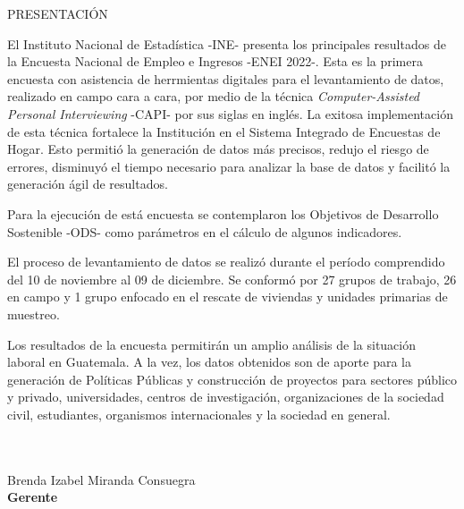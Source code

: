 \begin{center}
{\Bold \LARGE PRESENTACIÓN}\\[2cm]
\end{center}

El Instituto Nacional de Estadística -INE- presenta los principales resultados de la Encuesta Nacional de Empleo e Ingresos -ENEI 2022-. Esta es la primera encuesta con asistencia de herrmientas digitales para el levantamiento de datos, realizado en campo cara a cara, por medio de la técnica \textit{Computer-Assisted Personal Interviewing} -CAPI- por sus siglas en inglés. La exitosa implementación de esta técnica fortalece la Institución en el Sistema Integrado de Encuestas de Hogar. Esto permitió la generación de datos más precisos, redujo el riesgo de errores, disminuyó el tiempo necesario para analizar la base de datos y facilitó la generación ágil de resultados.

Para la ejecución de está encuesta se contemplaron los Objetivos de Desarrollo Sostenible -ODS- como parámetros en el cálculo de algunos indicadores. 

El proceso de levantamiento de datos se realizó durante el período comprendido del 10 de noviembre al 09 de diciembre. Se conformó por 27 grupos de trabajo,  26 en campo y 1 grupo enfocado en el rescate de viviendas y unidades primarias de muestreo.

Los resultados de la encuesta permitirán un amplio análisis de la situación laboral en Guatemala. A la vez, los datos obtenidos son de aporte para la generación de Políticas Públicas y construcción de proyectos para sectores público y privado, universidades, centros de investigación, organizaciones de la sociedad civil, estudiantes, organismos internacionales y la sociedad en general.\\
\\
\\
\begin{center}
Brenda Izabel Miranda Consuegra\\
\textbf{Gerente}
\end{center}

